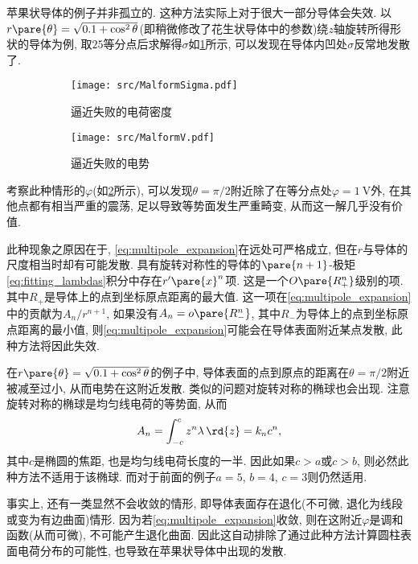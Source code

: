 \documentclass[hidelinks]{ctexart}
\begin{document}
苹果状导体的例子并非孤立的. 这种方法实际上对于很大一部分导体会失效. 以$r\pare{\theta} = \sqrt{0.1+\cos^2\theta}$(即稍微修改了花生状导体中的参数)绕$z$轴旋转所得形状的导体为例, 取$25$等分点后求解得$\sigma$如\cref{fig:逼近失败的电荷密度}所示, 可以发现在导体内凹处$\sigma$反常地发散了.
\begin{figure}[ht]
    \centering
    \begin{subfigure}[t]{.47\textwidth}
        \centering
        \texttt{[image: src/MalformSigma.pdf]}
        \caption{逼近失败的电荷密度}
        \label{fig:逼近失败的电荷密度}
    \end{subfigure}
    \begin{subfigure}[t]{.47\textwidth}
        \centering
        \texttt{[image: src/MalformV.pdf]}
        \caption{逼近失败的电势}
        \label{fig:逼近失败的电势}
    \end{subfigure}
    \caption{}
    \label{fig:失败的例子}
\end{figure}
\par
考察此种情形的$\varphi$(如\cref{fig:逼近失败的电势}所示), 可以发现$\theta=\pi/2$附近除了在等分点处$\varphi=\SI{1}{\volt}$外, 在其他点都有相当严重的震荡, 足以导致等势面发生严重畸变, 从而这一解几乎没有价值.
\par
此种现象之原因在于, \eqref{eq:multipole_expansion}在远处可严格成立, 但在$r$与导体的尺度相当时却有可能发散. 具有旋转对称性的导体的$\pare{n+1}$-极矩\eqref{eq:fitting_lambdas}积分中存在$r'\pare{x}^n$项. 这是一个$O\pare{R_+^n}$级别的项. 其中$R_+$是导体上的点到坐标原点距离的最大值. 这一项在\eqref{eq:multipole_expansion}中的贡献为$A_n/r^{n+1}$, 如果没有$A_n=o\pare{R_-^n}$, 其中$R_-$为导体上的点到坐标原点距离的最小值, 则\eqref{eq:multipole_expansion}可能会在导体表面附近某点发散, 此种方法将因此失效.
\par
在$r\pare{\theta} = \sqrt{0.1+\cos^2\theta}$的例子中, 导体表面的点到原点的距离在$\theta=\pi/2$附近被减至过小, 从而电势在这附近发散. 类似的问题对旋转对称的椭球也会出现. 注意旋转对称的椭球是均匀线电荷的等势面, 从而
\[ A_n = \int_{-c}^c z^n\lambda\,\rd{z} = k_n c^n, \]
其中$c$是椭圆的焦距, 也是均匀线电荷长度的一半. 因此如果$c>a$或$c>b$, 则必然此种方法不适用于该椭球. 而对于前面的例子$a=5$, $b=4$, $c=3$则仍然适用.
\par
事实上, 还有一类显然不会收敛的情形, 即导体表面存在退化(不可微, 退化为线段或变为有边曲面)情形. 因为若\eqref{eq:multipole_expansion}收敛, 则在这附近$\varphi$是调和函数(从而可微), 不可能产生退化曲面. 因此这自动排除了通过此种方法计算圆柱表面电荷分布的可能性, 也导致在苹果状导体中出现的发散.
\end{document}
